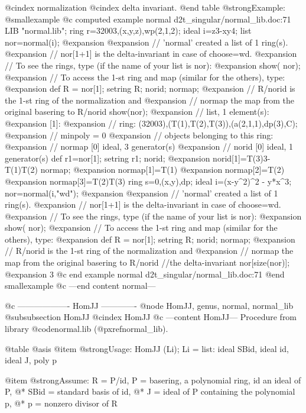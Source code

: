 @cindex normalization
@cindex delta invariant.
@end table
@strong{Example:}
@smallexample
@c computed example normal d2t_singular/normal_lib.doc:71 
LIB "normal.lib";
ring r=32003,(x,y,z),wp(2,1,2);
ideal i=z3-xy4;
list nor=normal(i);
@expansion{} 
@expansion{} // 'normal' created a list of 1 ring(s).
@expansion{} // nor[1+1] is the delta-invariant in case of choose=wd.
@expansion{} // To see the rings, type (if the name of your list is nor):
@expansion{}      show( nor);
@expansion{} // To access the 1-st ring and map (similar for the others), type:
@expansion{}      def R = nor[1]; setring R;  norid; normap;
@expansion{} // R/norid is the 1-st ring of the normalization and
@expansion{} // normap the map from the original basering to R/norid
show(nor);
@expansion{} // list, 1 element(s):
@expansion{} [1]:
@expansion{}    // ring: (32003),(T(1),T(2),T(3)),(a(2,1,1),dp(3),C);
@expansion{}    // minpoly = 0
@expansion{} // objects belonging to this ring:
@expansion{} // normap               [0]  ideal, 3 generator(s)
@expansion{} // norid                [0]  ideal, 1 generator(s)
def r1=nor[1];
setring r1;
norid;
@expansion{} norid[1]=T(3)3-T(1)T(2)
normap;
@expansion{} normap[1]=T(1)
@expansion{} normap[2]=T(2)
@expansion{} normap[3]=T(2)T(3)
ring s=0,(x,y),dp;
ideal i=(x-y^2)^2 - y*x^3;
nor=normal(i,"wd");
@expansion{} 
@expansion{} // 'normal' created a list of 1 ring(s).
@expansion{} // nor[1+1] is the delta-invariant in case of choose=wd.
@expansion{} // To see the rings, type (if the name of your list is nor):
@expansion{}      show( nor);
@expansion{} // To access the 1-st ring and map (similar for the others), type:
@expansion{}      def R = nor[1]; setring R;  norid; normap;
@expansion{} // R/norid is the 1-st ring of the normalization and
@expansion{} // normap the map from the original basering to R/norid
//the delta-invariant
nor[size(nor)];
@expansion{} 3
@c end example normal d2t_singular/normal_lib.doc:71
@end smallexample
@c ---end content normal---

@c ------------------- HomJJ -------------
@node HomJJ, genus, normal, normal_lib
@subsubsection HomJJ
@cindex HomJJ
@c ---content HomJJ---
Procedure from library @code{normal.lib} (@pxref{normal_lib}).

@table @asis
@item @strong{Usage:}
HomJJ (Li); Li = list: ideal SBid, ideal id, ideal J, poly p

@item @strong{Assume:}
R = P/id, P = basering, a polynomial ring, id an ideal of P,
@* SBid = standard basis of id,
@* J = ideal of P containing the polynomial p,
@* p = nonzero divisor of R


